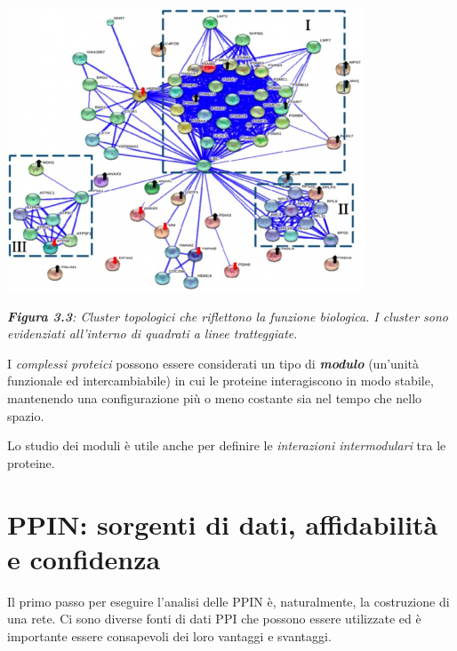\documentclass[11pt]{article}
\begin{document}
\begin{center}
\includegraphics[scale=0.65]{grafffo}

\begin{small}\textit{\textbf{Figura 3.3}: Cluster topologici che riflettono la funzione biologica. I cluster sono evidenziati all'interno di quadrati a linee tratteggiate}.\end{small}
\end{center}

I \textit{complessi proteici} possono essere considerati un tipo di \textit{\textbf{modulo}} (un'unità funzionale ed intercambiabile) in cui le proteine interagiscono in modo stabile, mantenendo una configurazione più o meno costante sia nel tempo che nello spazio.

Lo studio dei moduli è utile anche per definire le \textit{interazioni intermodulari} tra le proteine.

\newpage
\section{PPIN: sorgenti di dati, affidabilità e confidenza}
Il primo passo per eseguire l'analisi delle PPIN è, naturalmente, la costruzione di una rete. Ci sono diverse fonti di dati PPI che possono essere utilizzate ed è importante essere consapevoli dei loro vantaggi e svantaggi.
\end{document}
